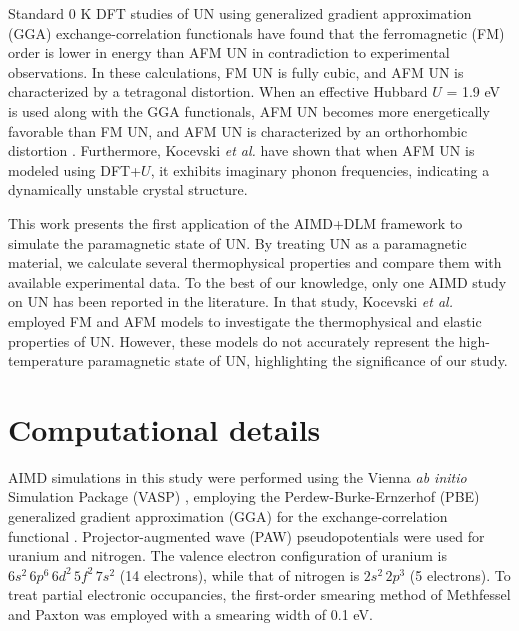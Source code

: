\documentclass[preprint, 12pt]{elsarticle}
\newcommand{\?}{\stackrel{?}{=}}
\begin{document}

Standard 0 K DFT studies of UN using generalized gradient approximation (GGA) exchange-correlation functionals have found that the ferromagnetic (FM) order is lower in energy than AFM UN \cite{Kocevski2022I} in contradiction to experimental observations. In these calculations, FM UN is fully cubic, and AFM UN is characterized by a tetragonal distortion. When an effective Hubbard $U$ = 1.9 eV is used along with the GGA functionals, AFM UN becomes more energetically favorable than FM UN, and AFM UN is characterized by an orthorhombic distortion \cite{Claisse2016b}. Furthermore, Kocevski \textit{et al.} \cite{Kocevski2022I} have shown that when AFM UN is modeled using DFT+$U$, it exhibits imaginary phonon frequencies, indicating a dynamically unstable crystal structure.

This work presents the first application of the AIMD+DLM framework to simulate the paramagnetic state of UN. By treating UN as a paramagnetic material, we calculate several thermophysical properties and compare them with available experimental data. To the best of our knowledge, only one AIMD study on UN has been reported in the literature. In that study, Kocevski \textit{et al.} \cite{Kocevski2023} employed FM and AFM models to investigate the thermophysical and elastic properties of UN. However, these models do not accurately represent the high-temperature paramagnetic state of UN, highlighting the significance of our study.


\section{Computational details}

AIMD simulations in this study were performed using the Vienna \textit{ab initio} Simulation Package (VASP) \cite{Kresse1993, Kresse1996a, Kresse1996b}, employing the Perdew-Burke-Ernzerhof (PBE) generalized gradient approximation (GGA) for the exchange-correlation functional \cite{Perdew1996}. Projector-augmented wave (PAW) pseudopotentials were used for uranium and nitrogen. The valence electron configuration of uranium is \( 6s^2 \, 6p^6 \, 6d^2 \, 5f^2 \, 7s^2 \) (14 electrons), while that of nitrogen is \( 2s^2 \, 2p^3 \) (5 electrons). To treat partial electronic occupancies, the first-order smearing method of Methfessel and Paxton \cite{Methfessel1989} was employed with a smearing width of 0.1 eV.
\end{document}
